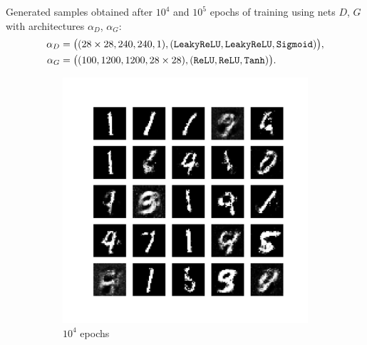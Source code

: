 \documentclass{beamer}
\begin{document}
	\begin{frame}
		\vspace{0.3cm}
		Generated samples obtained after $10^{4}$ and $10^{5}$ epochs of training using nets $D$, $G$ with architectures $\alpha_D$, $\alpha_G$:
		\vspace{-0.1cm}	
		\begin{align*}
			\alpha_D &= \big((28 \times 28, 240, 240, 1), (\text{\texttt{LeakyReLU}}, \text{\texttt{LeakyReLU}}, \text{\texttt{Sigmoid}})\big), \\
			\alpha_G &= \big((100, 1200, 1200, 28 \times 28), (\text{\texttt{ReLU}}, \text{\texttt{ReLU}}, \text{\texttt{Tanh}})\big).
		\end{align*}
		\vspace{-0.5cm}
		\begin{figure}[H]
			\begin{center}
				\begin{subfigure}{0.45\textwidth}
					\includegraphics[scale = 0.23, trim = {3cm 3cm 3cm 3cm},clip]{regenerated_mnist_data_10000.pdf}
					\caption{$10^{4}$ epochs}
				\end{subfigure}
				\hspace{0.2cm}
				\begin{subfigure}{0.45\textwidth}

\end{subfigure}
\end{center}
\end{figure}
\end{frame}
\end{document}
